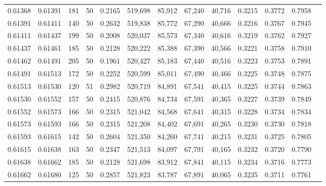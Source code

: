 \begin{tabular}{rrrrrrrrrrrrr}
0.61368 & 0.61391 &   181 &  50 &                                     0.2165 & 519,698 &  85,912 &  67,240 &  40,716 & 0.3215 & 0.3772 & 0.7958 \\
0.61391 & 0.61411 &   140 &  50 &                                     0.2632 & 519,838 &  85,772 &  67,290 &  40,666 & 0.3216 & 0.3767 & 0.7945 \\
0.61411 & 0.61437 &   199 &  50 &                                     0.2008 & 520,037 &  85,573 &  67,340 &  40,616 & 0.3219 & 0.3762 & 0.7927 \\
0.61437 & 0.61461 &   185 &  50 &                                     0.2128 & 520,222 &  85,388 &  67,390 &  40,566 & 0.3221 & 0.3758 & 0.7910 \\
0.61462 & 0.61491 &   205 &  50 &                                     0.1961 & 520,427 &  85,183 &  67,440 &  40,516 & 0.3223 & 0.3753 & 0.7891 \\
0.61491 & 0.61513 &   172 &  50 &                                     0.2252 & 520,599 &  85,011 &  67,490 &  40,466 & 0.3225 & 0.3748 & 0.7875 \\
0.61513 & 0.61530 &   120 &  51 &                                     0.2982 & 520,719 &  84,891 &  67,541 &  40,415 & 0.3225 & 0.3744 & 0.7863 \\
0.61530 & 0.61552 &   157 &  50 &                                     0.2415 & 520,876 &  84,734 &  67,591 &  40,365 & 0.3227 & 0.3739 & 0.7849 \\
0.61552 & 0.61573 &   166 &  50 &                                     0.2315 & 521,042 &  84,568 &  67,641 &  40,315 & 0.3228 & 0.3734 & 0.7834 \\
0.61573 & 0.61593 &   166 &  50 &                                     0.2315 & 521,208 &  84,402 &  67,691 &  40,265 & 0.3230 & 0.3730 & 0.7818 \\
0.61593 & 0.61615 &   142 &  50 &                                     0.2604 & 521,350 &  84,260 &  67,741 &  40,215 & 0.3231 & 0.3725 & 0.7805 \\
0.61615 & 0.61638 &   163 &  50 &                                     0.2347 & 521,513 &  84,097 &  67,791 &  40,165 & 0.3232 & 0.3720 & 0.7790 \\
0.61638 & 0.61662 &   185 &  50 &                                     0.2128 & 521,698 &  83,912 &  67,841 &  40,115 & 0.3234 & 0.3716 & 0.7773 \\
0.61662 & 0.61680 &   125 &  50 &                                     0.2857 & 521,823 &  83,787 &  67,891 &  40,065 & 0.3235 & 0.3711 & 0.7761 \\

\end{tabular}
